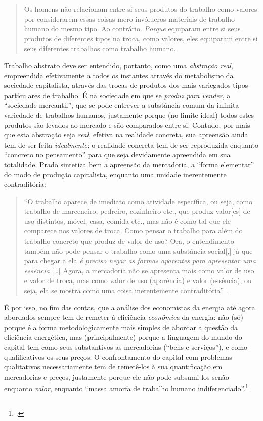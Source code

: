 \documentclass[12pt]{article}
\numberwithin{equation}{section}
\theoremstyle{plain}
\theoremstyle{definition}
\theoremstyle{remark}
\begin{document}
\begin{quote}
Os homens não relacionam entre si seus produtos do trabalho como valores por considerarem essas coisas mero invólucros materiais de trabalho humano do mesmo tipo. Ao contrário. \emph{Porque} equiparam entre si seus produtos de diferentes tipos na troca, como valores, eles equiparam entre si seus diferentes trabalhos como trabalho humano. \parencite[p. 149, grifo meu]{Marx2017}
\end{quote}

Trabalho abstrato deve ser entendido, portanto, como uma \emph{abstração real}, empreendida efetivamente a todos os instantes através do metabolismo da sociedade capitalista, através das trocas de produtos dos mais variegados tipos particulares de trabalho. É na sociedade em que se \emph{produz para vender}, a ``sociedade mercantil'', que se pode entrever a substância comum da infinita variedade de trabalhos humanos, justamente porque (no limite ideal) todos estes produtos são levados ao mercado e são comparados entre si. Contudo, por mais que esta abstração seja \emph{real}, efetiva na realidade concreta, sua apreensão ainda tem de ser feita \emph{idealmente}; o realidade concreta tem de ser reproduzida enquanto ``concreto no pensamento'' para que seja devidamente apreendida em sua totalidade. Prado sintetiza bem a apreensão da mercadoria, a ``forma elementar'' do modo de produção capitalista, enquanto uma unidade inerentemente contraditória:

\begin{quote}
``O trabalho aparece de imediato como atividade específica, ou seja, como trabalho de marceneiro, pedreiro, cozinheiro etc., que produz valor{[}es{]} de uso distintos, móvel, casa, comida etc., mas não é como tal que ele comparece nos valores de troca. Como pensar o trabalho para além do trabalho concreto que produz de valor de uso? Ora, o entendimento também não pode pensar o trabalho como uma substância social{[},{]} já que para chegar a ela \emph{é preciso negar as formas aparentes para apresentar uma essência} {[}\ldots{]} Agora, a mercadoria não se apresenta mais como valor de uso e valor de troca, mas como valor de uso (aparência) e valor (essência), ou seja, ela se mostra como uma coisa inerentemente contraditória'' \parencite[p. 4, grifo meu]{Prado2026}.
\end{quote}

É por isso, no fim das contas, que a análise dos economistas da energia até agora abordados sempre tem de remeter à eficiência \emph{econômica} da energia: não (só) porque é a forma metodologicamente mais simples de abordar a questão da eficiência energética, mas (principalmente) porque a linguagem do mundo do capital tem como seus substantivos as mercadorias (``bens e serviços''), e como qualificativos os seus preços. O confrontamento do capital com problemas qualitativos necessariamente tem de remetê-los à sua quantificação em mercadorias e preços, justamente porque ele não pode subsumi-los senão enquanto \emph{valor}, enquanto ``massa amorfa de trabalho humano indiferenciado''.\footnote{\parencite[p. 116]{Marx2017}.}
\end{document}

